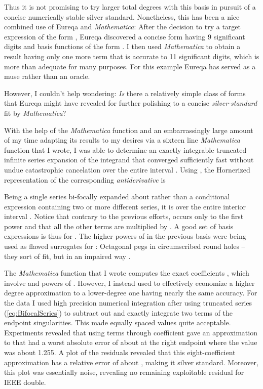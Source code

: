 \documentclass[12pt,english]{article}
\begin{document}
Thus it is not promising to try larger total degrees with this basis
in pursuit of a concise numerically stable silver standard. Nonetheless,
this has been a nice combined use of Eureqa and \textsl{Mathematica}:
After the decision to try a target expression of the form ,
Eureqa discovered a concise form having 9 significant digits and basis
functions of the form . I then used \textsl{Mathematica}
to obtain a result having only one more term that is accurate to 11
significant digits, which is more than adequate for many purposes.
For this example Eureqa has served as a muse rather than an oracle.

However, I couldn't help wondering: \textsl{Is} there a relatively
simple class of forms that Eureqa might have revealed for further
polishing to a concise \textsl{silver-standard} fit by\textsl{ Mathematica}?

With the help of the \textsl{Mathematica} \textsl{
}function and an embarrassingly large amount of my time adapting its
results to my desires via a sixteen line \textsl{Mathematica} function
that I wrote, I was able to determine an exactly integrable truncated
infinite series expansion of the integrand that converged sufficiently
fast without undue catastrophic cancelation over the entire interval
. Using ,
the Hornerized representation of the corresponding \textsl{antiderivative}
is\vspace{-5pt}

Being a single series bi-focally expanded about  rather than
a conditional expression containing two or more different series,
it is  over the entire interior interval . Notice
that contrary to the previous efforts,  occurs
only to the first power and that all the other terms are multiplied
by . A good set of basis expressions is thus 
for . The higher powers of  in
the previous basis were being used as flawed surrogates for :
Octagonal pegs in circumscribed round holes -- they sort of fit, but
in an impaired way .

The \textsl{Mathematica} function that I wrote computes the exact
coefficients , which involve  and powers of .
However, I instead used  to effectively
economize a higher degree approximation to a lower-degree one having
nearly the same accuracy. For the data I used high precision numerical
integration after using truncated series (\ref{eq:BifocalSeries})
to subtract out and exactly integrate two terms of the endpoint singularities.
This made equally spaced  values quite acceptable. Experiments
revealed that using terms through coefficient  gave an approximation
to  that had a worst absolute error of about 
at the right endpoint where the value was about 1.255. A plot of the
residuals revealed that this eight-coefficient approximation has a
relative error of about , making it silver standard.
Moreover, this plot was essentially noise, revealing no remaining
exploitable residual for IEEE double.
\end{document}
